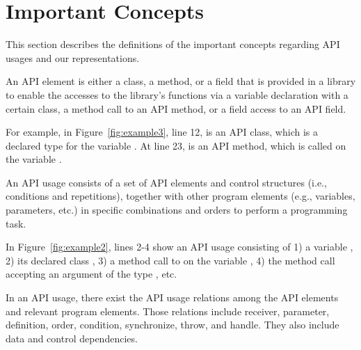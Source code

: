 \section{Important Concepts}
\label{sec:concepts}

This section describes the definitions of the important concepts
regarding API usages and our representations.

\begin{Definition}
  An API element is either a class, a method, or a field that is
  provided in a library to enable the accesses to the library's
  functions via a variable declaration with a certain class, a method
  call to an API method, or a field access to an API field.
\end{Definition}

For example, in Figure~\ref{fig:example3}, line 12,  is
an API class, which is a declared type for the variable
. At line 23,  is an API
method, which is called on the variable .

\begin{Definition}
An API usage consists of a set of API elements and control structures
(i.e., conditions and repetitions), together with other program
elements (e.g., variables, parameters, etc.) in specific combinations
and orders to perform a programming task.
\end{Definition}

In Figure~\ref{fig:example2}, lines 2-4 show an API usage consisting
of 1) a variable , 2) its declared class ,
3) a method call to  on the variable
, 4) the method call  accepting an
argument of the type , etc.

\begin{Definition}
  In an API usage, there exist the API usage relations among the API
  elements and relevant program elements. Those relations include
  receiver, parameter, definition, order, condition, synchronize,
  throw, and handle. They also include data and control dependencies.
\end{Definition}

